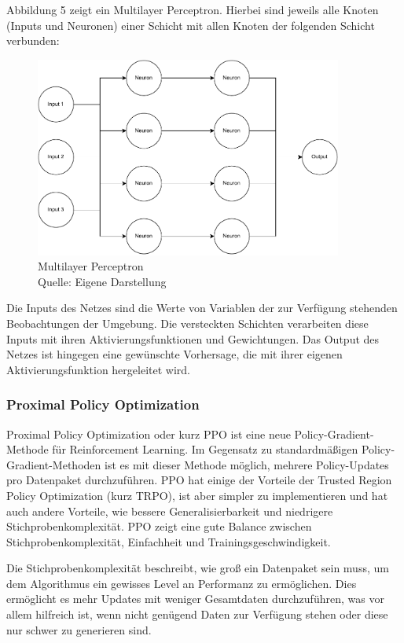 Abbildung 5 zeigt ein Multilayer Perceptron. Hierbei sind jeweils alle Knoten (Inputs und Neuronen) einer Schicht mit allen Knoten der folgenden Schicht verbunden:
\nopagebreak
\begin{figure}[H]
	\centering
	\includegraphics[width=0.9\textwidth]{Bilder/mlp2.drawio} 
	\caption[Multilayer Perceptron]{Multilayer Perceptron\\ Quelle: Eigene Darstellung}
\end{figure}	

Die Inputs des Netzes sind die Werte von Variablen der zur Verfügung stehenden Beobachtungen der Umgebung. Die versteckten Schichten verarbeiten diese Inputs mit ihren Aktivierungsfunktionen und Gewichtungen. Das Output des Netzes ist hingegen eine gewünschte Vorhersage, die mit ihrer eigenen Aktivierungsfunktion hergeleitet wird.

\newpage
\subsubsection{Proximal Policy Optimization}
Proximal Policy Optimization oder kurz PPO ist eine neue Policy-Gradient-Methode für Reinforcement Learning. Im Gegensatz zu standardmäßigen Policy-Gradient-Methoden ist es mit dieser Methode möglich, mehrere Policy-Updates pro Datenpaket durchzuführen. PPO hat einige der Vorteile der Trusted Region Policy Optimization (kurz TRPO), ist aber simpler zu implementieren und hat auch andere Vorteile, wie bessere Generalisierbarkeit und niedrigere Stichprobenkomplexität. PPO zeigt eine gute Balance zwischen Stichprobenkomplexität, Einfachheit und Trainingsgeschwindigkeit. \cite[S. 1]{schulman_proximal_2017}

Die Stichprobenkomplexität beschreibt, wie groß ein Datenpaket sein muss, um dem Algorithmus ein gewisses Level an Performanz zu ermöglichen. Dies ermöglicht es mehr Updates mit weniger Gesamtdaten durchzuführen, was vor allem hilfreich ist, wenn nicht genügend Daten zur Verfügung stehen oder diese nur schwer zu generieren sind.

